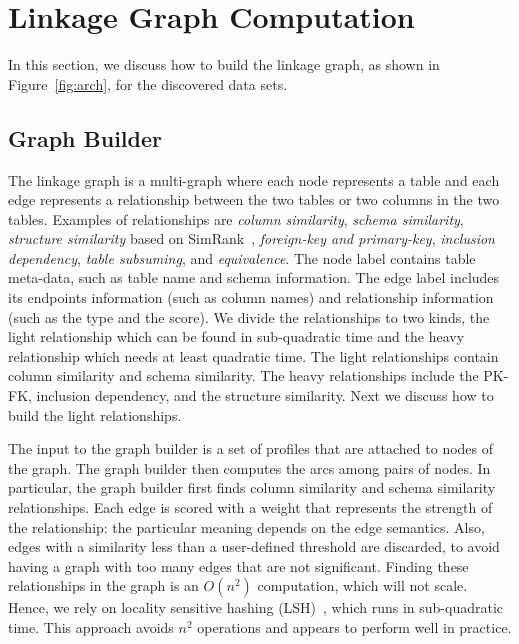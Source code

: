 \section{Linkage Graph Computation}
\label{sec:stitching}
 In this section, we
discuss how to build the linkage graph, as shown in Figure~\ref{fig:arch}, for the discovered data sets.



\subsection{Graph Builder}\label{subsec:graphbuild}



The linkage graph is a multi-graph where each node represents a table and each
edge represents a relationship between the two tables or two columns in the two
tables. Examples of relationships are \emph{column similarity}, \emph{schema
similarity}, \emph{structure similarity} based on SimRank~\cite{DBLP:conf/kdd/JehW02}, \emph{foreign-key and primary-key}, \emph{inclusion dependency}, \emph{table subsuming}, and \emph{equivalence}. The node label contains table meta-data, such as table name and schema information. The edge label includes its endpoints information (such as column names) and relationship information (such as the type and the score). We divide the relationships to two kinds, the light relationship which can be found in sub-quadratic time and the heavy relationship which needs at least quadratic time. The light relationships contain column similarity and schema similarity. The heavy relationships include the PK-FK, inclusion dependency, and the structure similarity. Next we discuss how to build the light relationships.


The input to the graph builder is a set of profiles that are attached to nodes of the graph. The graph builder then computes the arcs among pairs of nodes. In particular, the graph builder first finds column similarity and schema similarity relationships. Each edge is scored with a weight that represents the strength of the relationship: the particular meaning depends on the edge semantics.  Also, edges with a similarity less than a user-defined threshold are discarded, to avoid having a graph with too many edges that are not significant. Finding these relationships in the graph is an $O(n^2)$ computation, which will not scale.  Hence, we rely on locality sensitive hashing (LSH)~\cite{DBLP:conf/compgeom/DatarIIM04}, which runs in sub-quadratic time. This approach avoids $n^2$ operations and appears to perform well in practice.



